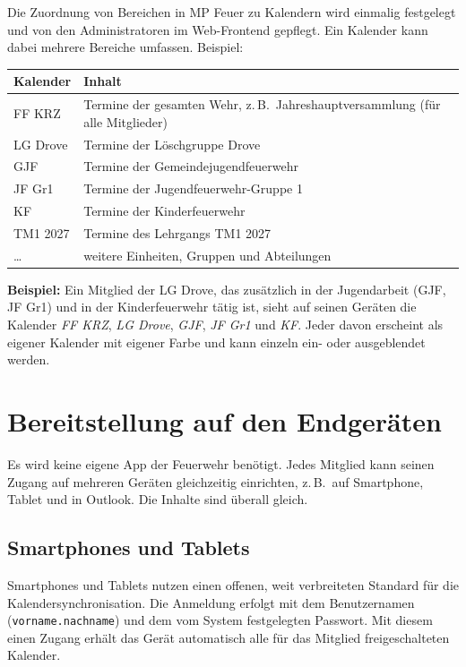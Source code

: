 \documentclass[a4paper,fontsize=10pt]{scrartcl}
\begin{document}
Die Zuordnung von Bereichen in MP Feuer zu Kalendern wird einmalig
festgelegt und von den Administratoren im Web-Frontend gepflegt. Ein
Kalender kann dabei mehrere Bereiche umfassen. Beispiel:

\begin{center}
\begin{tabularx}{0.85\textwidth}{lX}
\toprule
\textbf{Kalender} & \textbf{Inhalt} \\
\midrule
FF KRZ   & Termine der gesamten Wehr, z.\,B.\ Jahreshauptversammlung
           (für alle Mitglieder) \\
LG Drove & Termine der Löschgruppe Drove \\
GJF      & Termine der Gemeindejugendfeuerwehr \\
JF Gr1   & Termine der Jugendfeuerwehr-Gruppe 1 \\
KF       & Termine der Kinderfeuerwehr \\
TM1 2027 & Termine des Lehrgangs TM1 2027 \\
\ldots   & weitere Einheiten, Gruppen und Abteilungen \\
\bottomrule
\end{tabularx}
\end{center}

\textbf{Beispiel:} Ein Mitglied der LG Drove, das zusätzlich in der
Jugendarbeit (GJF, JF Gr1) und in der Kinderfeuerwehr tätig ist, sieht auf
seinen Geräten die Kalender \emph{FF KRZ}, \emph{LG Drove}, \emph{GJF},
\emph{JF Gr1} und \emph{KF}. Jeder davon erscheint als eigener Kalender mit
eigener Farbe und kann einzeln ein- oder ausgeblendet werden.

\section{Bereitstellung auf den Endgeräten}

Es wird keine eigene App der Feuerwehr benötigt. Jedes Mitglied kann seinen
Zugang auf mehreren Geräten gleichzeitig einrichten, z.\,B.\ auf Smartphone,
Tablet und in Outlook. Die Inhalte sind überall gleich.

\subsection*{Smartphones und Tablets}

Smartphones und Tablets nutzen einen offenen, weit verbreiteten Standard für
die Kalendersynchronisation. Die Anmeldung erfolgt mit dem Benutzernamen
(\texttt{vorname.nachname}) und dem vom System festgelegten Passwort. Mit
diesem einen Zugang erhält das Gerät automatisch alle für das Mitglied
freigeschalteten Kalender.
\end{document}
